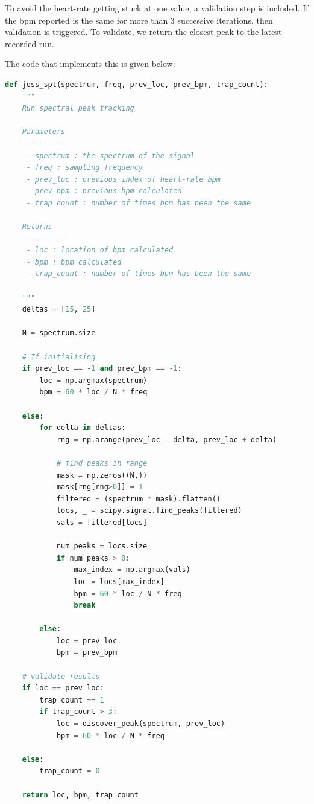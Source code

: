 \documentclass[12pt,a4paper,twoside,openany]{report}
\begin{document}
To avoid the heart-rate getting stuck at one value, a validation step is
included. If the bpm reported is the same for more than 3 successive
iterations, then
validation is triggered. To validate, we return the closest peak to the latest
recorded run.

The code that implements this is given below:

\begin{lstlisting}[language=Python]
def joss_spt(spectrum, freq, prev_loc, prev_bpm, trap_count):
    """
    Run spectral peak tracking

    Parameters
    ----------
     - spectrum : the spectrum of the signal
     - freq : sampling frequency
     - prev_loc : previous index of heart-rate bpm
     - prev_bpm : previous bpm calculated
     - trap_count : number of times bpm has been the same

    Returns
    ----------
     - loc : location of bpm calculated
     - bpm : bpm calculated
     - trap_count : number of times bpm has been the same

    """
    deltas = [15, 25]

    N = spectrum.size

    # If initialising
    if prev_loc == -1 and prev_bpm == -1:
        loc = np.argmax(spectrum)
        bpm = 60 * loc / N * freq

    else:
        for delta in deltas:
            rng = np.arange(prev_loc - delta, prev_loc + delta)

            # find peaks in range
            mask = np.zeros((N,))
            mask[rng[rng>0]] = 1
            filtered = (spectrum * mask).flatten()
            locs, _ = scipy.signal.find_peaks(filtered)
            vals = filtered[locs]

            num_peaks = locs.size
            if num_peaks > 0:
                max_index = np.argmax(vals)
                loc = locs[max_index]
                bpm = 60 * loc / N * freq
                break

        else:
            loc = prev_loc
            bpm = prev_bpm

    # validate results
    if loc == prev_loc:
        trap_count += 1
        if trap_count > 3:
            loc = discover_peak(spectrum, prev_loc)
            bpm = 60 * loc / N * freq

    else:
        trap_count = 0

    return loc, bpm, trap_count

\end{lstlisting}
\end{document}
